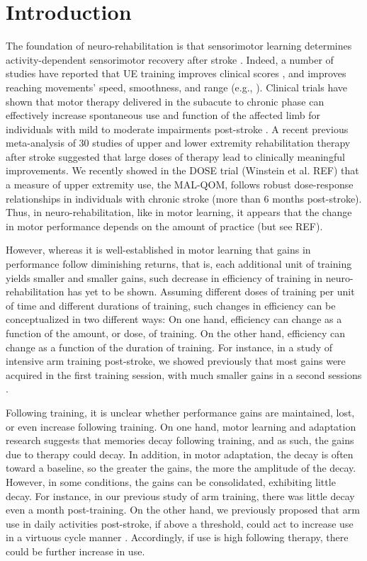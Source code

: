 \section{Introduction}
The foundation of neuro-rehabilitation is that sensorimotor learning determines activity-dependent sensorimotor recovery after stroke \cite{Kitago2013, Krakauer2006}. 
Indeed, a number of studies have reported that UE training improves clinical scores \cite{Cirstea2003}, \cite{Kamper2002, Kwakkel2006, McCrea2005} and improves reaching movements’ speed, smoothness, and range (e.g., \cite{Anton1996}). 
Clinical trials have shown that motor therapy delivered in the subacute to chronic phase can effectively increase spontaneous use and function of the affected limb for individuals with mild to moderate impairments post-stroke \cite{Wolf2006, Lohse2014}. 
A recent previous meta-analysis of 30 studies of upper and lower extremity rehabilitation therapy after stroke suggested that large doses of therapy lead to clinically meaningful improvements. 
We recently showed in the DOSE trial (Winstein et al. REF) that a measure of upper extremity use, the MAL-QOM, follows robust dose-response relationships in individuals with chronic stroke (more than 6 months post-stroke). 
Thus, in neuro-rehabilitation, like in motor learning, it appears that the change in motor performance depends on the amount of practice (but see REF). 

However, whereas it is well-established in motor learning that gains in performance follow diminishing returns, that is, each additional unit of training yields smaller and smaller gains, such decrease in efficiency of training in neuro-rehabilitation has yet to be shown. 
Assuming different doses of training per unit of time and different durations of training, such changes in efficiency can be conceptualized in two different ways: On one hand, efficiency can change as a function of the amount, or dose, of training. 
On the other hand, efficiency can change as a function of the duration of training. 
For instance, in a study of intensive arm training post-stroke, we showed previously that most gains were acquired in the first training session, with much smaller gains in a second sessions \cite{Park2016}.

Following training, it is unclear whether performance gains are maintained, lost, or even increase following training.
On one hand, motor learning and adaptation research suggests that memories decay following training, and as such, the gains due to therapy could decay. 
In addition, in motor adaptation, the decay is often toward a baseline, so the greater the gains, the more the amplitude of the decay. 
However, in some conditions, the gains can be consolidated, exhibiting little decay. 
For instance, in our previous study of arm training, there was little decay even a month post-training. 
On the other hand, we previously proposed that arm use in daily activities post-stroke, if above a threshold, could act to increase use in a virtuous cycle manner \cite{Hidaka2012, Schweighofer2009}. 
Accordingly, if use is high following therapy, there could be further increase in use. 

